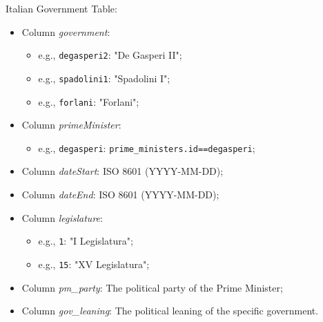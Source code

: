 Italian Government Table:
\begin{itemize}
    \item Column \textit{government}:
    \begin{itemize}
        \item e.g., \texttt{degasperi2}: "De Gasperi II";
        \item e.g., \texttt{spadolini1}: "Spadolini I";
        \item e.g., \texttt{forlani}: "Forlani";
    \end{itemize}
    \item Column \textit{primeMinister}:
    \begin{itemize}
        \item e.g., \texttt{degasperi}: \texttt{prime\_ministers.id==degasperi};
    \end{itemize}
    \item Column \textit{dateStart}: ISO 8601 (YYYY-MM-DD);
    \item Column \textit{dateEnd}: ISO 8601 (YYYY-MM-DD);
    \item Column \textit{legislature}:
    \begin{itemize}
        \item e.g., \texttt{1}: "I Legislatura";
        \item e.g., \texttt{15}: "XV Legislatura";
    \end{itemize}
    \item Column \textit{pm\_party}: The political party of the Prime Minister;
    \item Column \textit{gov\_leaning}: The political leaning of the specific government.
\end{itemize}

